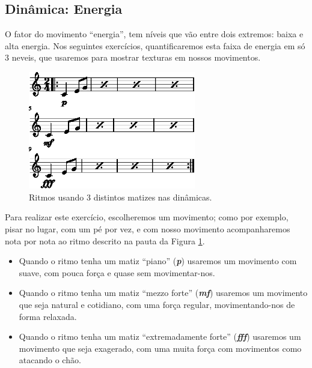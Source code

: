 \subsection{Dinâmica: Energia }
\label{sec:musicalidadenergia}
O fator do movimento ``energia'', 
tem níveis  que vão entre dois extremos: baixa e alta energia.
Nos seguintes exercícios, quantificaremos esta faixa de energia em só 3 neveis,
que usaremos para mostrar texturas em nossos movimentos.

\begin{figure}[!h]
  \centering
    \includegraphics[width=0.65\textwidth]{chapters/cap-musicalidade/dinamica-energia-1.eps}
\caption{Ritmos usando 3 distintos matizes nas dinâmicas.}
\label{fig:dinamica-energia-ex1}
\end{figure}

\begin{example}
Para realizar este exercício, escolheremos um movimento; como por exemplo,
pisar no lugar, com um pé por vez, 
e com nosso movimento  acompanharemos nota por nota 
ao ritmo descrito na pauta da Figura \ref{fig:dinamica-energia-ex1}.
\begin{itemize}
\item Quando o ritmo tenha um matiz ``piano'' (\textbf{\textit{p}}) 
usaremos um movimento com suave,
com pouca força e quase sem movimentar-nos.
\item Quando o ritmo tenha um matiz ``mezzo forte'' (\textbf{\textit{mf}}) 
usaremos um movimento que seja natural e cotidiano,
com uma força regular, movimentando-nos de forma relaxada.
\item Quando o ritmo tenha um matiz ``extremadamente forte''  (\textbf{\textit{fff}}) 
usaremos um movimento que seja exagerado,
com uma muita força com movimentos como atacando o chão.
\end{itemize}
\end{example}

